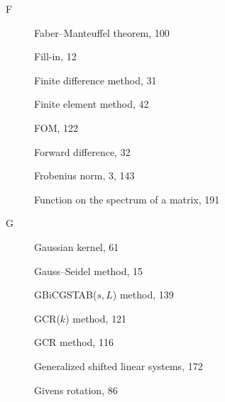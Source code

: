 \begin{description}
\item[F]
{Faber--Manteuffel theorem}, {100}\par

{Fill-in}, {12}\par

{Finite difference method}, {31}\par

{Finite element method}, {42}\par

{FOM}, {122}\par

{Forward difference}, {32}\par

{Frobenius norm}, {3, 143}\par

{Function on the spectrum of a matrix}, {191}\par

\item[G]
{Gaussian kernel}, {61}\par

{Gauss--Seidel method}, {15}\par

{GBiCGSTAB($s,L$) method}, {139}\par

{GCR($k$) method}, {121}\par

{GCR method}, {116}\par

{Generalized shifted linear systems}, {172}\par

{Givens rotation}, {86}\par


\end{description}
